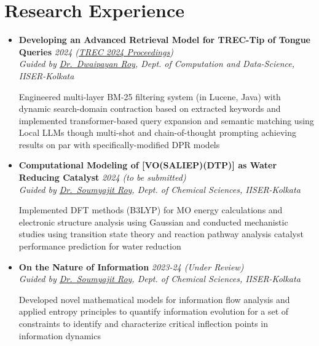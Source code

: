 \documentclass[a4paper,10.8pt]{article}
\newcommand{\resumeProject}[4]{
    \item\small{
        \textbf{#1} \hfill \textit{#2}\\
        \textit{#3}\\
        \begin{itemize}[leftmargin=1.5em,label=\textbullet,nosep,itemsep=0.5pt]
            #4
        \end{itemize}
    }\vspace{2pt}
}
\newcommand{\compactSection}[2]{
    \section{#1}
    \vspace{-0.1cm}
    #2
    \vspace{-0.2cm}
}
\begin{document}
\compactSection{Research Experience}{
\begin{itemize}[leftmargin=*,label={},itemsep=4pt]


    \resumeProject{Developing an Advanced Retrieval Model for TREC-Tip of Tongue Queries}{2024 (\href{https://trec.nist.gov/pubs/trec33/papers/IISER-K.tot.pdf}{TREC 2024 Proceedings})}
    {Guided by \href{https://dwaipayanroy.github.io/}{Dr.\ Dwaipayan Roy}, Dept. of Computation and Data-Science, IISER-Kolkata}
    {Engineered multi-layer BM-25 filtering system (in Lucene, Java) with dynamic search-domain contraction based on extracted keywords and implemented transformer-based query expansion and semantic matching using Local LLMs though multi-shot and chain-of-thought prompting achieving results on par with specifically-modified DPR models}
     
    \resumeProject{Computational Modeling of [VO(SALIEP)(DTP)] as Water Reducing Catalyst}{2024 (to be submitted)}
    {Guided by \href{https://soumyajit-roy.com/}{Dr.\ Soumyajit Roy}, Dept. of Chemical Sciences, IISER-Kolkata}
    {Implemented DFT methods (B3LYP) for MO energy calculations and electronic structure analysis using Gaussian and conducted mechanistic studies using transition state theory and reaction pathway analysis catalyst performance prediction for water reduction}
    

    
    \resumeProject{On the Nature of Information}{2023-24 (Under Review)}
    {Guided by \href{https://soumyajit-roy.com/}{Dr.\ Soumyajit Roy}, Dept. of Chemical Sciences, IISER-Kolkata}
    {Developed novel mathematical models for information flow analysis and applied entropy principles to quantify information evolution for a set of constraints to identify and characterize critical inflection points in information dynamics}
    
\end{itemize}}
\end{document}
